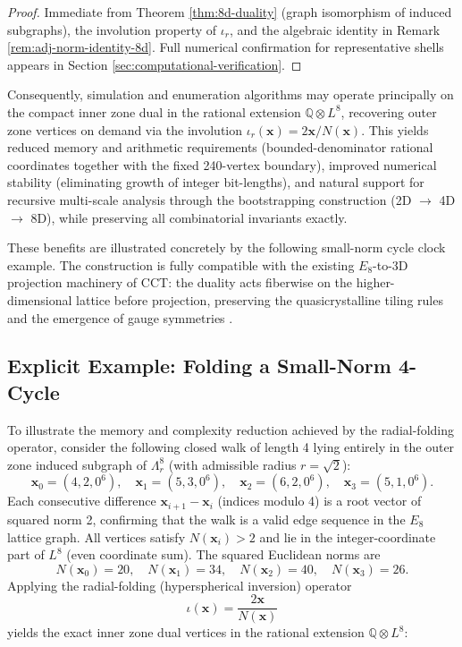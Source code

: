 \documentclass{article}
\begin{document}
\begin{proof}
Immediate from Theorem \ref{thm:8d-duality} (graph isomorphism of induced subgraphs), the involution property of $\iota_r$, and the algebraic identity in Remark \ref{rem:adj-norm-identity-8d}. Full numerical confirmation for representative shells appears in Section \ref{sec:computational-verification}.
\end{proof}

Consequently, simulation and enumeration algorithms may operate principally on the compact inner zone dual in the rational extension $\mathbb{Q} \otimes L^8$, recovering outer zone vertices on demand via the involution $\iota_r(\mathbf{x}) = 2\mathbf{x} / N(\mathbf{x})$. This yields reduced memory and arithmetic requirements (bounded-denominator rational coordinates together with the fixed 240-vertex boundary), improved numerical stability (eliminating growth of integer bit-lengths), and natural support for recursive multi-scale analysis through the bootstrapping construction (2D $\to$ 4D $\to$ 8D), while preserving all combinatorial invariants exactly.

These benefits are illustrated concretely by the following small-norm cycle clock example. The construction is fully compatible with the existing $E_8$-to-3D projection machinery of CCT: the duality acts fiberwise on the higher-dimensional lattice before projection, preserving the quasicrystalline tiling rules and the emergence of gauge symmetries \cite{FangIrwin2015}.

\subsection{Explicit Example: Folding a Small-Norm 4-Cycle}
\label{subsec:cct-explicit-example}

To illustrate the memory and complexity reduction achieved by the radial-folding operator, consider the following closed walk of length 4 lying entirely in the outer zone induced subgraph of $\Lambda_r^8$ (with admissible radius $r = \sqrt{2}$):
\[
\mathbf{x}_0 = (4, 2, 0^6),\quad
\mathbf{x}_1 = (5, 3, 0^6),\quad
\mathbf{x}_2 = (6, 2, 0^6),\quad
\mathbf{x}_3 = (5, 1, 0^6).
\]
Each consecutive difference $\mathbf{x}_{i+1} - \mathbf{x}_i$ (indices modulo 4) is a root vector of squared norm 2, confirming that the walk is a valid edge sequence in the $E_8$ lattice graph. All vertices satisfy $N(\mathbf{x}_i) > 2$ and lie in the integer-coordinate part of $L^8$ (even coordinate sum). The squared Euclidean norms are
\[
N(\mathbf{x}_0) = 20,\quad N(\mathbf{x}_1) = 34,\quad N(\mathbf{x}_2) = 40,\quad N(\mathbf{x}_3) = 26.
\]
Applying the radial-folding (hyperspherical inversion) operator
\[
\iota(\mathbf{x}) = \frac{2 \mathbf{x}}{N(\mathbf{x})}
\]
yields the exact inner zone dual vertices in the rational extension $\mathbb{Q} \otimes L^8$:
\end{document}
